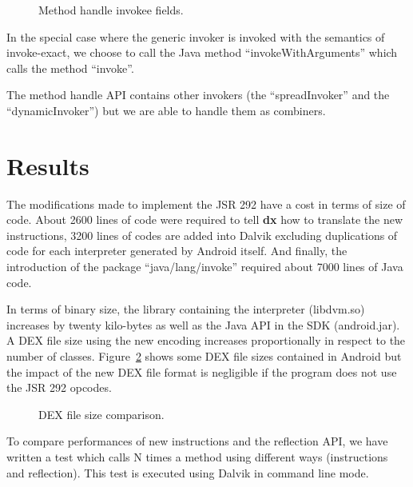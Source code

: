 \documentclass{sig-alternate}
\def \DALVIK{Dalvik\xspace}
\def \Jsr{JSR\xspace}
\def \JSR{\Jsr 292\xspace}
\def \ANDROID{Android\xspace}
\newcommand{\fixme}[1]{{\color{red}FIXME #1}}
\begin{document}
      \begin{figure}[!ht]
        \centering \vspace{-1.5em}
        \caption{Method handle invokee fields.}
        \label{invokeeFields}
      \end{figure}

      In the special case where the generic invoker is invoked with the semantics of invoke-exact,
      we choose to call the Java method ``invokeWithArguments'' which calls the method ``invoke''.

      The method handle API contains other invokers (the ``spreadInvoker'' and the ``dynamicInvoker'')
      but we are able to handle them as combiners.

\section{Results}
 \label{result}

  The modifications made to implement the \JSR have a cost in terms of size of code.
  About 2600 lines of code were required to tell {\bf dx} how to translate the new instructions,
  3200 lines of codes are added into Dalvik excluding duplications of code for each interpreter generated by \ANDROID itself.
  And finally, the introduction of the package ``java/lang/invoke'' required about 7000 lines of Java code.


  In terms of binary size, the library containing the interpreter (libdvm.so) increases by twenty kilo-bytes
  as well as the Java API in the SDK (android.jar).
  A DEX file size using the new encoding increases proportionally in respect to the number of classes.
  Figure~\ref{Rsize} shows some DEX file sizes contained in \ANDROID but
  the impact of the new DEX file format is negligible if the program does not use the \JSR opcodes.

  \begin{figure}[!ht]
    \dataset
    \resizebox{.9\linewidth}{!}{}
    \caption{DEX file size comparison.}
    \label{Rsize}
  \end{figure}

  To compare performances of new instructions and the reflection API,
  we have written a test which calls N times a method using different ways (instructions and reflection).
  This test is executed using \DALVIK in command line mode.
\end{document}
